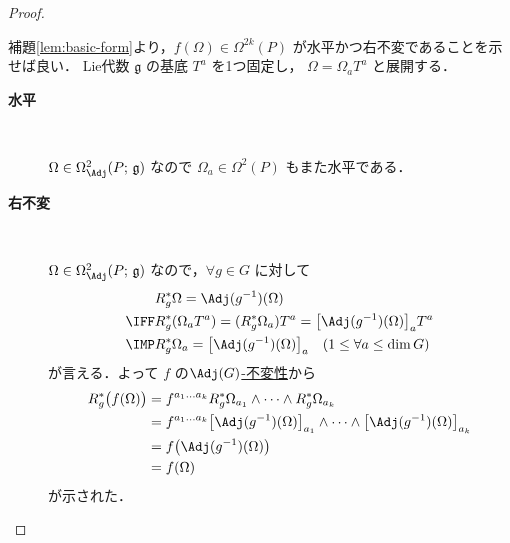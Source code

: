 \documentclass[TQFT_main]{subfiles}
\begin{document}
\begin{proof}
\begin{enumerate}
        補題\ref{lem:basic-form}より，$f(\Omega) \in \Omega^{2k}(P)$ が水平かつ右不変であることを示せば良い． 
        Lie代数 $\mathfrak{g}$ の基底 $T^a$ を1つ固定し， $\Omega = \Omega_a T^a$ と展開する．
        \begin{description}
            \item[\textbf{水平}]　
            
            $\Omega \in \Omega^2_{\Adj} (P;\, \mathfrak{g})$ なので $\Omega_a \in \Omega^2 (P)$ もまた水平である．

            \item[\textbf{右不変}]　
            
            $\Omega \in \Omega^2_{\Adj} (P;\, \mathfrak{g})$ なので，$\forall g \in G$ に対して
            \begin{align}
                &R_g^* \Omega = \Adj (g^{-1}) (\Omega)\\
                \IFF &R_g^* (\Omega_a T^a) = (R_g^* \Omega_a) T^a = \bigl[\Adj(g^{-1}) (\Omega)\bigr]_a T^a \\
                \IMP &R_g^* \Omega_a =\bigl[\Adj(g^{-1}) (\Omega)\bigr]_a \quad (1 \le \forall a \le \dim G)
            \end{align}
            が言える．よって $f$ の\hyperref[def:invariant]{$\Adj (G)$-不変性}から
            \begin{align}
                R_g^* \bigl( f(\Omega) \bigr) 
                &= f^{a_1\dots a_{k}} R_g^* \Omega_{a_1} \wedge \cdots \wedge R_g^* \Omega_{a_k} \\
                &= f^{a_1\dots a_{k}} \bigl[\Adj(g^{-1}) (\Omega)\bigr]_{a_1} \wedge \cdots \wedge \bigl[\Adj(g^{-1}) (\Omega)\bigr]_{a_k} \\
                &= f \bigl( \Adj(g^{-1})(\Omega) \bigr) \\
                &= f(\Omega)
            \end{align}
            が示された．
        \end{description}


\end{enumerate}
\end{proof}
\end{document}

